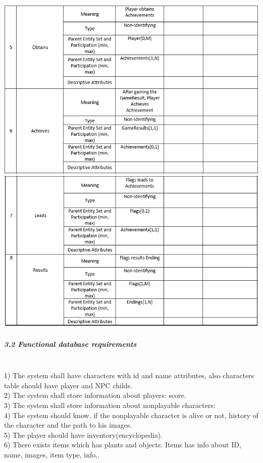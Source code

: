 \documentclass[12pt,a4paper]{article}
\newcommand{\ind}{\indent\indent}
\begin{document}
\begin{center}
\includegraphics[scale=0.6]{images/LDR7.jpg}     
\includegraphics[scale=0.6]{images/LDR8.jpg}
 
\end{center}
\newpage
\subparagraph{3.2 Functional database requirements\\}
\ind\\
1) The system shall have characters with id and name attributes, also characters table should have player and NPC childs.\\
2) The system shall store information about players: score.\\
3) The system shall store information about nonplayable characters: \\
4) The system should know, if the nonplayable character is alive or not, history of the character and the path to his images.\\
5)  The player should have inventory(encyclopedia).\\
6)   There exists items which has plants and objects. Items has info about ID, name, images, item type, info,.\\
\end{document}
